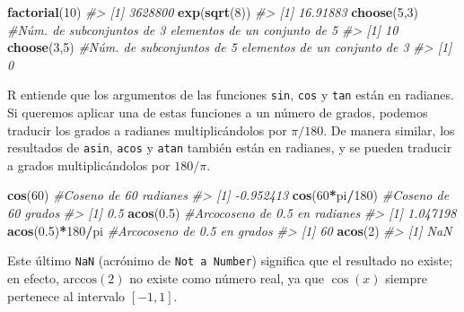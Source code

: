 \documentclass[
]{book}
\newenvironment{Shaded}{\begin{snugshade}}{\end{snugshade}}
\newcommand{\CommentTok}[1]{\textcolor[rgb]{0.56,0.35,0.01}{\textit{#1}}}
\newcommand{\DecValTok}[1]{\textcolor[rgb]{0.00,0.00,0.81}{#1}}
\newcommand{\FloatTok}[1]{\textcolor[rgb]{0.00,0.00,0.81}{#1}}
\newcommand{\KeywordTok}[1]{\textcolor[rgb]{0.13,0.29,0.53}{\textbf{#1}}}
\newcommand{\NormalTok}[1]{#1}
\newcommand{\OperatorTok}[1]{\textcolor[rgb]{0.81,0.36,0.00}{\textbf{#1}}}
\theoremstyle{definition}
\theoremstyle{definition}
\theoremstyle{definition}
\theoremstyle{remark}
\begin{document}
\begin{Shaded}
\begin{Highlighting}[]
\KeywordTok{factorial}\NormalTok{(}\DecValTok{10}\NormalTok{)}
\CommentTok{\#\textgreater{} [1] 3628800}
\KeywordTok{exp}\NormalTok{(}\KeywordTok{sqrt}\NormalTok{(}\DecValTok{8}\NormalTok{))}
\CommentTok{\#\textgreater{} [1] 16.91883}
\KeywordTok{choose}\NormalTok{(}\DecValTok{5}\NormalTok{,}\DecValTok{3}\NormalTok{)  }\CommentTok{\#Núm. de subconjuntos de 3 elementos de un conjunto de 5 }
\CommentTok{\#\textgreater{} [1] 10}
\KeywordTok{choose}\NormalTok{(}\DecValTok{3}\NormalTok{,}\DecValTok{5}\NormalTok{)  }\CommentTok{\#Núm. de subconjuntos de 5 elementos de un conjunto de 3}
\CommentTok{\#\textgreater{} [1] 0}
\end{Highlighting}
\end{Shaded}

R entiende que los argumentos de las funciones \texttt{sin}, \texttt{cos} y \texttt{tan} están en radianes. Si queremos aplicar una de estas funciones a un número de grados, podemos traducir los grados a radianes multiplicándolos por \(\pi/180\).
De manera similar, los resultados de \texttt{asin}, \texttt{acos} y \texttt{atan} también están en radianes, y se pueden traducir a grados
multiplicándolos por \(180/\pi\).

\begin{Shaded}
\begin{Highlighting}[]
\KeywordTok{cos}\NormalTok{(}\DecValTok{60}\NormalTok{) }\CommentTok{\#Coseno de 60 radianes}
\CommentTok{\#\textgreater{} [1] {-}0.952413}
\KeywordTok{cos}\NormalTok{(}\DecValTok{60}\OperatorTok{*}\NormalTok{pi}\OperatorTok{/}\DecValTok{180}\NormalTok{) }\CommentTok{\#Coseno de 60 grados}
\CommentTok{\#\textgreater{} [1] 0.5}
\KeywordTok{acos}\NormalTok{(}\FloatTok{0.5}\NormalTok{)  }\CommentTok{\#Arcocoseno de 0.5 en radianes}
\CommentTok{\#\textgreater{} [1] 1.047198}
\KeywordTok{acos}\NormalTok{(}\FloatTok{0.5}\NormalTok{)}\OperatorTok{*}\DecValTok{180}\OperatorTok{/}\NormalTok{pi }\CommentTok{\#Arcocoseno de 0.5 en grados}
\CommentTok{\#\textgreater{} [1] 60}
\KeywordTok{acos}\NormalTok{(}\DecValTok{2}\NormalTok{) }
\CommentTok{\#\textgreater{} [1] NaN}
\end{Highlighting}
\end{Shaded}

Este último \texttt{NaN} (acrónimo de \texttt{Not\ a\ Number}) significa que el resultado no existe; en efecto, \(\mathrm{arccos}(2)\) no existe como número real, ya que \(\cos(x)\) siempre pertenece al intervalo \([-1,1]\).
\end{document}
